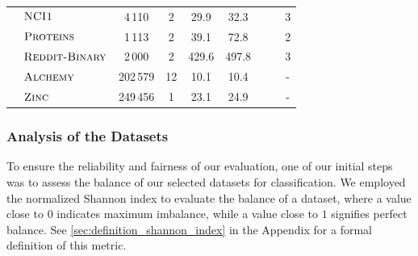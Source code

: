 \begin{table}[!htb]
\begin{center}
{\begin{tabular}{@{}c <{\enspace}@{}lccccccc@{}}
				& $\textsc{NCI1}$          & 4\,110            & 2                         & 29.9                          & 32.3                          & \cmark                   & \xmark   & 3   \\
				& $\textsc{Proteins}$      & 1\,113            & 2                         & 39.1                          & 72.8                          & \cmark                   & \xmark  & 2    \\
				& $\textsc{Reddit-Binary}$ & 2\,000            & 2                         & 429.6                         & 497.8                         & \xmark                   & \xmark & 3     \\ 
				\midrule
				\multirow{2}{*}{\rotatebox{90}{Reg.}}
				& $\textsc{Alchemy}$       & 202\,579          & 12                        & 10.1                          & 10.4                         & \cmark                   & \cmark & -     \\
				& $\textsc{Zinc}$       & 249\,456          & 1                        & 23.1                         & 24.9                          & \cmark                   & \cmark & -     \\
				\bottomrule
			\end{tabular}}
		\label{tab:overview_datasets}
	\end{center}
\end{table}

\subsubsection{Analysis of the Datasets}
To ensure the reliability and fairness of our evaluation, one of our initial steps was to assess the balance of our selected datasets for classification. We employed the normalized Shannon index to evaluate the balance of a dataset, where a value close to $0$ indicates maximum imbalance, while a value close to $1$ signifies perfect balance. See \cref{sec:definition_shannon_index} in the Appendix for a formal definition of this metric.

\begin{table}[!htb]
	\caption{An overview of the normalized Shannon index calculated for each dataset.}
	\label{tab:shannon_index}
	\centering
\end{table}

